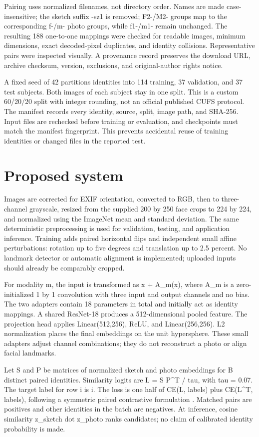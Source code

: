 \documentclass[cameraready]{ieeeconf}
\begin{document}
Pairing uses normalized filenames, not directory order. Names are made case-insensitive; the sketch suffix -sz1 is removed; F2-/M2- groups map to the corresponding f-/m- photo groups, while f1-/m1- remain unchanged. The resulting 188 one-to-one mappings were checked for readable images, minimum dimensions, exact decoded-pixel duplicates, and identity collisions. Representative pairs were inspected visually. A provenance record preserves the download URL, archive checksum, version, exclusions, and original-author rights notice.


A fixed seed of 42 partitions identities into 114 training, 37 validation, and 37 test subjects. Both images of each subject stay in one split. This is a custom 60/20/20 split with integer rounding, not an official published CUFS protocol. The manifest records every identity, source, split, image path, and SHA-256. Input files are rechecked before training or evaluation, and checkpoints must match the manifest fingerprint. This prevents accidental reuse of training identities or changed files in the reported test.


\section{Proposed system}

Images are corrected for EXIF orientation, converted to RGB, then to three-channel grayscale, resized from the supplied 200 by 250 face crops to 224 by 224, and normalized using the ImageNet mean and standard deviation. The same deterministic preprocessing is used for validation, testing, and application inference. Training adds paired horizontal flips and independent small affine perturbations: rotation up to five degrees and translation up to 2.5 percent. No landmark detector or automatic alignment is implemented; uploaded inputs should already be comparably cropped.


For modality m, the input is transformed as x + A\_m(x), where A\_m is a zero-initialized 1 by 1 convolution with three input and output channels and no bias. The two adapters contain 18 parameters in total and initially act as identity mappings. A shared ResNet-18 \cite{ref3} produces a 512-dimensional pooled feature. The projection head applies Linear(512,256), ReLU, and Linear(256,256). L2 normalization places the final embeddings on the unit hypersphere. These small adapters adjust channel combinations; they do not reconstruct a photo or align facial landmarks.


Let S and P be matrices of normalized sketch and photo embeddings for B distinct paired identities. Similarity logits are L = S P\textasciicircum{}T / tau, with tau = 0.07. The target label for row i is i. The loss is one half of CE(L, labels) plus CE(L\textasciicircum{}T, labels), following a symmetric paired contrastive formulation \cite{ref4}. Matched pairs are positives and other identities in the batch are negatives. At inference, cosine similarity z\_sketch dot z\_photo ranks candidates; no claim of calibrated identity probability is made.
\end{document}
